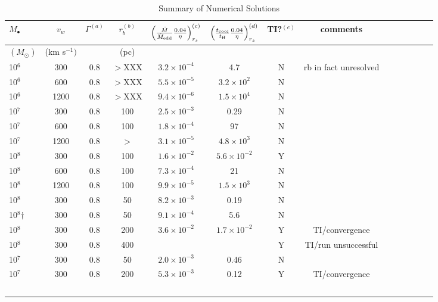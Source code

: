 \documentclass[usenatbib,fleqn]{mn2e}
\begin{document}
\begin{table}
\centering
\begin{minipage}{18cm}
\caption{Summary of Numerical Solutions}
\begin{tabular}{lccccccccccccc}
\hline
{$M_{\bullet}$} & {$v_{w}$} & {$\Gamma^{(a)}$} & {$r_b^{(b)}$} &
{$\left(\frac{\dot{M}}{\dot{M}_{\rm edd}}\frac{0.04}{\eta}\right)_{r_{s}}^{(c)}$} & {$\left(\frac{t_{\rm cool}}{t_{\rm ff}}\frac{0.04}{\eta}\right)_{r_s}^{(d)}$} & TI?$^{(e)}$ & {comments}\\
\hline
$(M_{\odot})$ & (km s$^{-1})$ & & (pc) & & &  & \\
\hline
10$^{6}$ & 300 & 0.8 & $>$XXX & $ 3.2 \times 10^{ -4 }$ & 4.7 & N & rb in fact
unresolved \\
10$^{6}$ & 600 & 0.8 & $>$XXX & $ 5.5 \times 10^{ -5 }$ & $ 3.2 \times
10^{ 2 }$ & N & \\
10$^{6}$ & 1200 & 0.8 & $>$XXX & $ 9.4 \times 10^{ -6 }$ & $ 1.5 \times
10^{ 4 }$ &  N &\\
10$^{7}$ & 300 & 0.8 & 100 & $ 2.5 \times 10^{ -3 }$ & 0.29 & N &\\
10$^{7}$ & 600 & 0.8 & 100 & $ 1.8 \times 10^{ -4 }$ & 97 &N  & \\
10$^{7}$ & 1200 & 0.8 & $>$ & $ 3.1 \times 10^{ -5 }$ & $ 4.8 \times
10^{ 3 }$ & N & \\
\hline
10$^{8}$ & 300 & 0.8 & 100 & $ 1.6 \times 10^{ -2 }$ & $ 5.6 \times 10^{
  -2 }$ & Y  & \\
10$^{8}$ & 600 & 0.8 & 100 & $ 7.3 \times 10^{ -4 }$ & 21 & N & \\
10$^{8}$ & 1200 & 0.8 & 100 & $ 9.9 \times 10^{ -5 }$ & $ 1.5 \times 10^{
  3 }$ & N &  \\
10$^{8}$ & 300 & 0.8 & 50 & $ 8.2 \times 10^{ -3 }$ & 0.19 & N & \\
10$^{8}$$\dagger$ & 300 & 0.8 & 50 & $ 9.1 \times 10^{ -4 }$ & 5.6 & N & \\
10$^{8}$ & 300 & 0.8 & 200 & $ 3.6 \times 10^{ -2 }$ & $ 1.7 \times 10^{
  -2 }$ &Y & TI/convergence \\
10$^{8}$ & 300 & 0.8 & 400 &  &  & Y & TI/run unsuccessful\\
10$^{7}$ & 300 & 0.8 & 50 & $ 2.0 \times 10^{ -3 }$ & 0.46 & N &\\
10$^{7}$ & 300 & 0.8 & 200 & $ 5.3 \times 10^{ -3 }$ & 0.12 & Y & TI/convergence\\
$$
\end{tabular}
\end{minipage}
\end{table}
\end{document}
